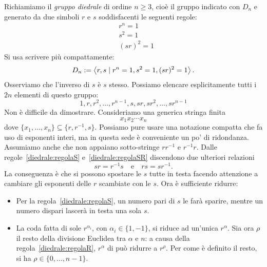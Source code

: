 \begin{rich}\label{rich:GruppoDiedrale}
Richiamiamo il {\em gruppo diedrale} di ordine $n \ge 3$, cioè il gruppo indicato con $D_n$ e generato da due simboli $r$ e $s$ soddisfacenti le seguenti regole:
\begin{align}
& r^n    = 1 \label{diedrale:regolaR} \\
& s^2    = 1 \label{diedrale:regolaS} \\
& (sr)^2 = 1 \label{diedrale:regolaSR}
\end{align}
Si usa scrivere più compattamente:
\[D_n := \left\langle r, s \mid r^n = 1, s^2 = 1, (sr)^2 = 1\right\rangle .\]
Osserviamo che l'inverso di $s$ è $s$ stesso. Possiamo elencare esplicitamente tutti i $2n$ elementi di questo gruppo:
\[ 1, r,  r^2,  \dots{}, r^{n-1}, s, sr, sr^2, \dots{}, sr^{n-1} \]
Non è difficile da dimostrare. Consideriamo una generica stringa finita
\[x_1 x_2 \cdots{} x_n\]
dove $\{x_1, \dots{}, x_n\} \subseteq \{r, r^{-1}, s\}$. Possiamo pure usare una notazione compatta che fa uso di esponenti interi, ma in questa sede è conveniente un po' di ridondanza. Assumiamo anche che non appaiano sotto-stringe $rr^{-1}$ e $r^{-1}r$. Dalle regole~\ref{diedrale:regolaS} e~\ref{diedrale:regolaSR} discendono due ulteriori relazioni
\[ sr = r^{-1}s \quad\text{e}\quad rs = sr^{-1} .\]
La conseguenza è che si possono spostare le $s$ tutte in testa facendo attenzione a cambiare gli esponenti delle $r$ scambiate con le $s$. Ora è sufficiente ridurre:
\begin{itemize}
\item Per la regola~\ref{diedrale:regolaS}, un numero pari di $s$ le farà sparire, mentre un numero dispari lascerà in testa una sola $s$.
\item La coda fatta di sole $r^{\alpha_i}$, con $\alpha_i \in \{1, -1\}$, si riduce ad un'unica $r^\alpha$. Sia ora $\rho$ il resto della divisione Euclidea tra $\alpha$ e $n$: a causa della regola~\ref{diedrale:regolaR}, $r^\alpha$ di può ridurre a $r^\rho$. Per come è definito il resto, si ha $\rho \in \{0, \dots{}, n-1\}$.
\end{itemize}

\end{rich}
